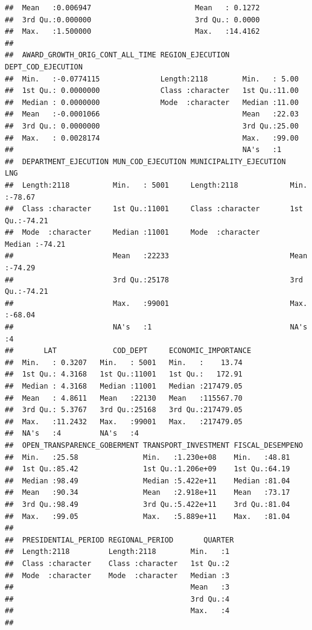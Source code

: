 \documentclass[
]{article}
\begin{document}
\begin{verbatim}
##  Mean   :0.006947                        Mean   : 0.1272                     
##  3rd Qu.:0.000000                        3rd Qu.: 0.0000                     
##  Max.   :1.500000                        Max.   :14.4162                     
##                                                                              
##  AWARD_GROWTH_ORIG_CONT_ALL_TIME REGION_EJECUTION   DEPT_COD_EJECUTION
##  Min.   :-0.0774115              Length:2118        Min.   : 5.00     
##  1st Qu.: 0.0000000              Class :character   1st Qu.:11.00     
##  Median : 0.0000000              Mode  :character   Median :11.00     
##  Mean   :-0.0001066                                 Mean   :22.03     
##  3rd Qu.: 0.0000000                                 3rd Qu.:25.00     
##  Max.   : 0.0028174                                 Max.   :99.00     
##                                                     NA's   :1         
##  DEPARTMENT_EJECUTION MUN_COD_EJECUTION MUNICIPALITY_EJECUTION      LNG        
##  Length:2118          Min.   : 5001     Length:2118            Min.   :-78.67  
##  Class :character     1st Qu.:11001     Class :character       1st Qu.:-74.21  
##  Mode  :character     Median :11001     Mode  :character       Median :-74.21  
##                       Mean   :22233                            Mean   :-74.29  
##                       3rd Qu.:25178                            3rd Qu.:-74.21  
##                       Max.   :99001                            Max.   :-68.04  
##                       NA's   :1                                NA's   :4       
##       LAT             COD_DEPT     ECONOMIC_IMPORTANCE
##  Min.   : 0.3207   Min.   : 5001   Min.   :    13.74  
##  1st Qu.: 4.3168   1st Qu.:11001   1st Qu.:   172.91  
##  Median : 4.3168   Median :11001   Median :217479.05  
##  Mean   : 4.8611   Mean   :22130   Mean   :115567.70  
##  3rd Qu.: 5.3767   3rd Qu.:25168   3rd Qu.:217479.05  
##  Max.   :11.2432   Max.   :99001   Max.   :217479.05  
##  NA's   :4         NA's   :4                          
##  OPEN_TRANSPARENCE_GOBERMENT TRANSPORT_INVESTMENT FISCAL_DESEMPENO
##  Min.   :25.58               Min.   :1.230e+08    Min.   :48.81   
##  1st Qu.:85.42               1st Qu.:1.206e+09    1st Qu.:64.19   
##  Median :98.49               Median :5.422e+11    Median :81.04   
##  Mean   :90.34               Mean   :2.918e+11    Mean   :73.17   
##  3rd Qu.:98.49               3rd Qu.:5.422e+11    3rd Qu.:81.04   
##  Max.   :99.05               Max.   :5.889e+11    Max.   :81.04   
##                                                                   
##  PRESIDENTIAL_PERIOD REGIONAL_PERIOD       QUARTER 
##  Length:2118         Length:2118        Min.   :1  
##  Class :character    Class :character   1st Qu.:2  
##  Mode  :character    Mode  :character   Median :3  
##                                         Mean   :3  
##                                         3rd Qu.:4  
##                                         Max.   :4  
## 
\end{verbatim}
\end{document}

